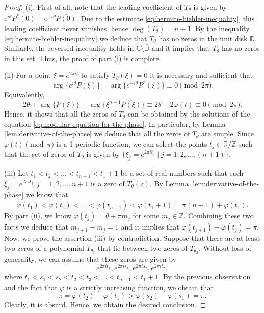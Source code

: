 \documentclass[reqno, a4paper]{amsart}
\def\Z{\mathbb{Z}}
\def\T{\mathbb{R}/\mathbb{Z}}
\theoremstyle{plain}
\theoremstyle{definition}
\theoremstyle{remarkstyle}
\numberwithin{equation}{section}
\begin{document}
\begin{proof}
    (i). First of all, note that the leading coefficient of $T_\theta$ is given by $e^{i\theta} \overline{P^*(0)}-e^{-i\theta} \overline{P(0)}$. Due to the estimate \eqref{eq:hermite-biehler-inequality}, this leading coefficient never vanishes, hence $\deg (T_\theta)=n+1$. By the inequality \eqref{eq:hermite-biehler-inequality} we deduce that $T_\theta$ has no zeros in the unit disk $\mathbb{D}$. Similarly, the reversed inequality holds in $\mathbb{C}\setminus \overline{\mathbb{D}}$ and it implies that $T_\theta$ has no zeros in this set. Thus, the proof of part (i) is complete.

    (ii) For a point $\xi=e^{2\pi i t}$ to satisfy $T_\theta(\xi)=0$ it is necessary and sufficient that 
    \begin{equation*}
       \arg\{e^{i\theta} P(\xi)\}- \arg\{e^{-i\theta}P^*(\xi)\}\equiv0 \pmod{2\pi}.
    \end{equation*}
    Equivalently, 
    \begin{equation*}
        2\theta+\arg\{P(\xi)\}-\arg\{\xi^{n+1}\overline{P(\xi)}\}\equiv 2\theta -2\varphi(t)\equiv 0\pmod{2\pi}.
    \end{equation*}
    Hence, it shows that all the zeros of $T_\theta$ can be obtained by the solutions of the equation \eqref{eq:modular-equation-for-the-phase}. In particular, by Lemma \ref{lem:derivative-of-the-phase} we deduce that all the zeros of $T_\theta$ are simple.  Since $\varphi(t)\pmod{\pi}$ is a 1-periodic function, we can select the points $t_j\in \T$ such that the set of zeros of $T_\theta$ is given by $\{\xi_j=e^{2\pi i t_j} \;|\; j=1,2, \ldots, (n+1)\}$. 

    (iii) Let $t_1<t_2<\ldots <t_{n+1}<t_1+1$ be a set of real numbers such that each $\xi_j=e^{2\pi i t_j}, j=1, 2, ..., n+1$ is a zero of $T_\theta(z)$. 
    By Lemma \ref{lem:derivative-of-the-phase} we know that 
    \begin{equation*}
        \varphi(t_1)<\varphi(t_2)<\ldots<\varphi(t_{n+1})<\varphi(t_1+1)=\pi (n+1) +\varphi(t_1). 
    \end{equation*}
    By part (ii), we know $\varphi(t_j)=\theta+\pi m_j$ for some $m_j\in\Z$. Combining these two facts we deduce that $m_{j+1}-m_j= 1$ and it implies that $\varphi(t_{j+1})-\varphi(t_j)=\pi$. Now, we prove the assertion (iii) by contradiction. Suppose that there are at least two zeros of a polynomial $T_{\theta_1}$ that lie between two zeros of $T_{\theta_2}$. Without loss of generality, we can assume that these zeros are given by 
    \begin{equation*}
        e^{2\pi i t_1}, e^{2\pi i s_1}, e^{2\pi i s_2}, e^{2\pi i t_2},
    \end{equation*}
    where $t_1<s_1<s_2<t_2<t_3<\ldots <t_{n+1}<t_1+1$. By the previous observation and the fact that $\varphi$ is a strictly increasing function, we obtain that 
    \begin{equation*}
        \pi=\varphi(t_2)-\varphi(t_1)>\varphi(s_2)-\varphi(s_1)=\pi.
    \end{equation*}
    Clearly, it is absurd. Hence, we obtain the desired conclusion.
\end{proof}
\end{document}
